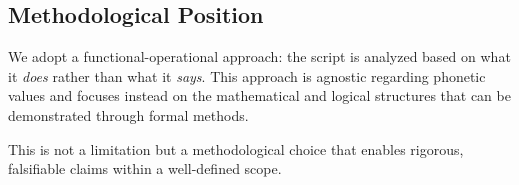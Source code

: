 \subsection{Methodological Position}

We adopt a functional-operational approach: the script is analyzed based on what it \emph{does} rather than what it \emph{says}. This approach is agnostic regarding phonetic values and focuses instead on the mathematical and logical structures that can be demonstrated through formal methods.

This is not a limitation but a methodological choice that enables rigorous, falsifiable claims within a well-defined scope.
